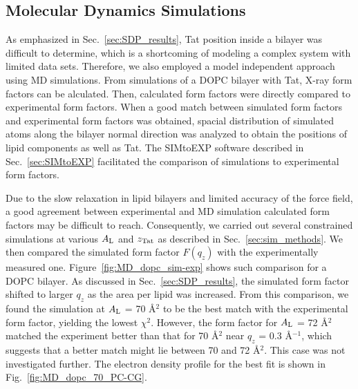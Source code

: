 
\newpage
\subsection{Molecular Dynamics Simulations}\label{sec:MD_results}
As emphasized in Sec.~\ref{sec:SDP_results}, Tat position inside a bilayer 
was difficult to determine, which is a shortcoming of modeling a complex system
with limited data sets. Therefore, we also employed a model independent 
approach using MD simulations. From simulations of
a DOPC bilayer with Tat, X-ray form factors can be alculated.
Then, calculated form factors were directly compared to experimental 
form factors. When a good match between simulated form factors and
experimental form factors was obtained, spacial distribution of simulated
atoms along the bilayer normal direction was analyzed to obtain 
the positions of lipid components as well as Tat. The SIMtoEXP software
\cite{Kucerka10} described in Sec.~\ref{sec:SIMtoEXP} facilitated the 
comparison of simulations to experimental form factors.

Due to the slow relaxation in lipid bilayers and limited accuracy of the force 
field, a good agreement between experimental and MD simulation calculated 
form factors may be difficult to reach. Consequently, we carried out several 
constrained simulations at various $A_\textrm{L}$ and $z_\textrm{Tat}$ as described
in Sec.~\ref{sec:sim_methods}. 
We then compared the simulated form factor $F(q_z)$ with the
experimentally measured one. Figure~\ref{fig:MD_dopc_sim-exp} shows such
comparison for a DOPC bilayer. As discussed in Sec.~\ref{sec:SDP_results}, 
the simulated form factor
shifted to larger $q_z$ as the area per lipid was increased. 
From this comparison, we found the simulation
at $A_\textrm{L}$ = 70 \AA$^2$ to be the best match with the experimental form
factor, yielding the lowest $\chi^2$. 
However, the form factor for $A_\textrm{L}$ = 72 \AA$^2$ matched the experiment
better than that for 70 \AA$^2$ near $q_z$ = 0.3 \AA$^{-1}$, which 
suggests that a better match might lie between 70 and 72 \AA$^2$. 
This case was not investigated further.
The electron density profile for the best fit is shown in 
Fig.~\ref{fig:MD_dopc_70_PC-CG}.

